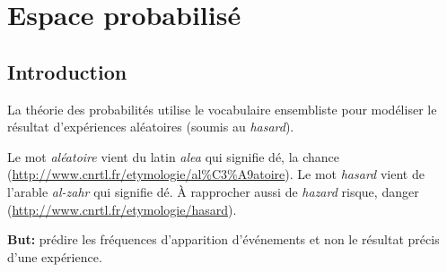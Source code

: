 \chapter{Espace probabilisé}

\sld{\pagebreak[5]}%

\section{Introduction}

La théorie des probabilités utilise le vocabulaire ensembliste pour modéliser le résultat d'expériences aléatoires (\ie soumis au \emph{hasard}).

\begin{remark}
	Le mot \textit{aléatoire} vient du latin \textit{alea} qui signifie dé, la chance (\url{http://www.cnrtl.fr/etymologie/al%C3%A9atoire}).
	Le mot \textit{hasard} vient de l'arable \textit{al-zahr} qui signifie dé. \`A rapprocher aussi de \textit{hazard} risque, danger (\url{http://www.cnrtl.fr/etymologie/hasard}).
\end{remark}




{\bf\sffamily But:} prédire les fréquences d'apparition d'événements et non le résultat précis d'une expérience.

\sld{\vfill\pagebreak[5]}%


